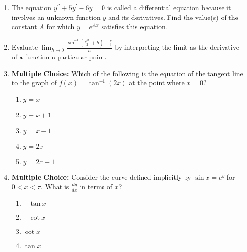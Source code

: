 \documentclass[12pt]{article}
\newif\ifans
\begin{document}
\begin{enumerate}
\item The equation $y^{\prime \prime}+5y^{\prime}-6y=0$ is called a \underline{differential equation} because it involves an unknown function $y$ and its derivatives.  Find the value(s) of the constant $A$ for which $y=e^{Ax}$ satisfies this equation. 

\ifans{\fbox{$A=-6$ and $A=1$}} \fi

\item Evaluate $\lim_{h \rightarrow 0}{\frac{\sin^{-1}{\left(\frac{\sqrt{3}}{2}+h\right)}-\frac{\pi}{3}}{h}}$ by interpreting the limit as the derivative of a function a particular point.

\ifans{\fbox{$\lim_{h \rightarrow 0}{\frac{\sin^{-1}{\left(\frac{\sqrt{3}}{2}+h\right)}-\frac{\pi}{3}}{h}}=\left.\frac{d}{dx}(\sin^{-1}{(x)}\right|_{x=\frac{\sqrt{3}}{2}}=\left.\frac{1}{\sqrt{1-x^2}}\right|_{x=\frac{\sqrt{3}}{2}}=2$}} \fi

\item {\bf Multiple Choice:} Which of the following is the equation of the tangent line to the graph of $f(x)=\tan^{-1}(2x)$ at the point where $x=0$?

\begin{enumerate}

\item $y=x$

\item $y=x+1$

\item $y=x-1$

\item $y=2x$

\item $y=2x-1$

\end{enumerate}

\ifans{\fbox{D}} \fi

\item {\bf Multiple Choice:} Consider the curve defined implicitly by $\sin{x}=e^y$ for $0<x<\pi$. What is $\frac{dy}{dx}$ in terms of $x$?

\begin{enumerate}

\item $-\tan{x}$

\item $-\cot{x}$

\item $\cot{x}$

\item $\tan{x}$


\end{enumerate}
\end{enumerate}
\end{document}
